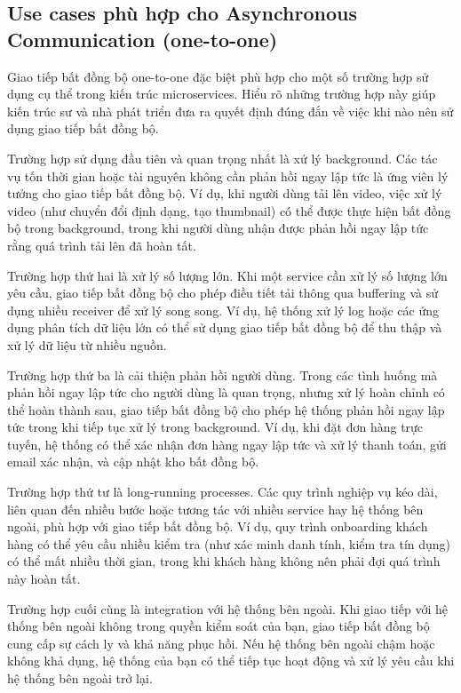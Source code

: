 \subsection{Use cases phù hợp cho Asynchronous Communication (one-to-one)}
Giao tiếp bất đồng bộ one-to-one đặc biệt phù hợp cho một số trường hợp sử dụng cụ thể trong kiến trúc microservices. Hiểu rõ những trường hợp này giúp kiến trúc sư và nhà phát triển đưa ra quyết định đúng đắn về việc khi nào nên sử dụng giao tiếp bất đồng bộ.

Trường hợp sử dụng đầu tiên và quan trọng nhất là xử lý background. Các tác vụ tốn thời gian hoặc tài nguyên không cần phản hồi ngay lập tức là ứng viên lý tưởng cho giao tiếp bất đồng bộ. Ví dụ, khi người dùng tải lên video, việc xử lý video (như chuyển đổi định dạng, tạo thumbnail) có thể được thực hiện bất đồng bộ trong background, trong khi người dùng nhận được phản hồi ngay lập tức rằng quá trình tải lên đã hoàn tất.

Trường hợp thứ hai là xử lý số lượng lớn. Khi một service cần xử lý số lượng lớn yêu cầu, giao tiếp bất đồng bộ cho phép điều tiết tải thông qua buffering và sử dụng nhiều receiver để xử lý song song. Ví dụ, hệ thống xử lý log hoặc các ứng dụng phân tích dữ liệu lớn có thể sử dụng giao tiếp bất đồng bộ để thu thập và xử lý dữ liệu từ nhiều nguồn.

Trường hợp thứ ba là cải thiện phản hồi người dùng. Trong các tình huống mà phản hồi ngay lập tức cho người dùng là quan trọng, nhưng xử lý hoàn chỉnh có thể hoàn thành sau, giao tiếp bất đồng bộ cho phép hệ thống phản hồi ngay lập tức trong khi tiếp tục xử lý trong background. Ví dụ, khi đặt đơn hàng trực tuyến, hệ thống có thể xác nhận đơn hàng ngay lập tức và xử lý thanh toán, gửi email xác nhận, và cập nhật kho bất đồng bộ.

Trường hợp thứ tư là long-running processes. Các quy trình nghiệp vụ kéo dài, liên quan đến nhiều bước hoặc tương tác với nhiều service hay hệ thống bên ngoài, phù hợp với giao tiếp bất đồng bộ. Ví dụ, quy trình onboarding khách hàng có thể yêu cầu nhiều kiểm tra (như xác minh danh tính, kiểm tra tín dụng) có thể mất nhiều thời gian, trong khi khách hàng không nên phải đợi quá trình này hoàn tất.

Trường hợp cuối cùng là integration với hệ thống bên ngoài. Khi giao tiếp với hệ thống bên ngoài không trong quyền kiểm soát của bạn, giao tiếp bất đồng bộ cung cấp sự cách ly và khả năng phục hồi. Nếu hệ thống bên ngoài chậm hoặc không khả dụng, hệ thống của bạn có thể tiếp tục hoạt động và xử lý yêu cầu khi hệ thống bên ngoài trở lại.

